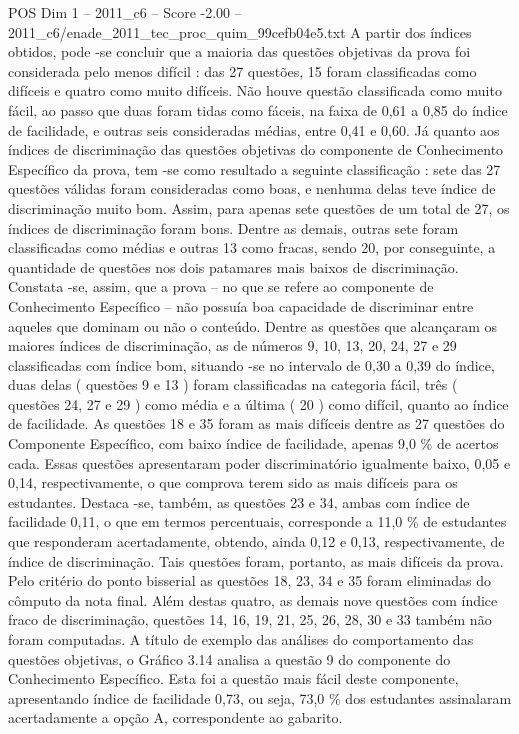 \begin{textsample}{POS Dim 1 – 2011\_c6 – Score -2.00 – 2011\_c6/enade\_2011\_tec\_proc\_quim\_99cefb04e5.txt}
A partir dos índices obtidos, pode -se concluir que a maioria das questões objetivas da prova foi considerada pelo menos difícil : das 27 questões, 15 foram classificadas como difíceis e quatro como muito difíceis.
Não houve questão classificada como muito fácil, ao passo que duas foram tidas como fáceis, na faixa de 0,61 a 0,85 do índice de facilidade, e outras seis consideradas médias, entre 0,41 e 0,60.
Já quanto aos índices de discriminação das questões objetivas do componente de Conhecimento Específico da prova, tem -se como resultado a seguinte classificação : sete das 27 questões válidas foram consideradas como boas, e nenhuma delas teve índice de discriminação muito bom.
Assim, para apenas sete questões de um total de 27, os índices de discriminação foram bons.
Dentre as demais, outras sete foram classificadas como médias e outras 13 como fracas, sendo 20, por conseguinte, a quantidade de questões nos dois patamares mais baixos de discriminação.
Constata -se, assim, que a prova – no que se refere ao componente de Conhecimento Específico – não possuía boa capacidade de discriminar entre aqueles que dominam ou não o conteúdo.
Dentre as questões que alcançaram os maiores índices de discriminação, as de números 9, 10, 13, 20, 24, 27 e 29 classificadas com índice bom, situando -se no intervalo de 0,30 a 0,39 do índice, duas delas ( questões 9 e 13 ) foram classificadas na categoria fácil, três ( questões 24, 27 e 29 ) como média e a última ( 20 ) como difícil, quanto ao índice de facilidade.
As questões 18 e 35 foram as mais difíceis dentre as 27 questões do Componente Específico, com baixo índice de facilidade, apenas 9,0 \% de acertos cada.
Essas questões apresentaram poder discriminatório igualmente baixo, 0,05 e 0,14, respectivamente, o que comprova terem sido as mais difíceis para os estudantes.
Destaca -se, também, as questões 23 e 34, ambas com índice de facilidade 0,11, o que em termos percentuais, corresponde a 11,0 \% de estudantes que responderam acertadamente, obtendo, ainda 0,12 e 0,13, respectivamente, de índice de discriminação.
Tais questões foram, portanto, as mais difíceis da prova.
Pelo critério do ponto bisserial as questões 18, 23, 34 e 35 foram eliminadas do cômputo da nota final.
Além destas quatro, as demais nove questões com índice fraco de discriminação, questões 14, 16, 19, 21, 25, 26, 28, 30 e 33 também não foram computadas.
A título de exemplo das análises do comportamento das questões objetivas, o Gráfico 3.14 analisa a questão 9 do componente do Conhecimento Específico.
Esta foi a questão mais fácil deste componente, apresentando índice de facilidade 0,73, ou seja, 73,0 \% dos estudantes assinalaram acertadamente a opção A, correspondente ao gabarito.

\end{textsample}
